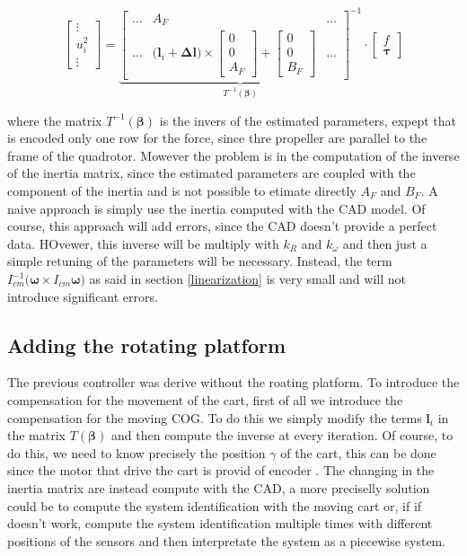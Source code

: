 \begin{equation}
	\begin{bmatrix}
		\vdots \\
		u_i^2 \\
		\vdots
	\end{bmatrix}
	=
	\underbrace{
	\begin{bmatrix}
		\dots   & A_F   & \dots  \\
		\dots & \Big(\mathbf{l}_i + \boldsymbol{\Delta l}\Big)\times\begin{bmatrix}0 \\ 0 \\ A_F \end{bmatrix}+\begin{bmatrix}0 \\ 0 \\ B_F\end{bmatrix} & \dots
	\end{bmatrix}^{-1}
	}_{T^{-1}(\boldsymbol{\beta})}	
	\cdot
	\begin{bmatrix}
		f \\
		\boldsymbol{\tau}
	\end{bmatrix}
	\label{eq:mixingMatrix}
\end{equation}

\noindent where the matrix $T^{-1}(\boldsymbol{\beta})$ is the invers of the estimated parameters, expept that is encoded only one row for the force, since thre propeller are parallel to the frame of the quadrotor. Mowever the problem is in the computation of the inverse of the inertia matrix, since the estimated parameters are coupled with the component of the inertia and is not possible to etimate directly $A_F$ and $B_F$. A naive approach is simply use the inertia computed with the CAD model. Of course, this approach will add errors, since the CAD doesn't provide a perfect data. HOvewer, this inverse will be multiply with $k_R$ and $k_{\omega}$ and then just a simple retuning of the parameters will be necessary. Instead, the term $I_{cm}^{-1}\bigl(\boldsymbol{\omega}\times I_{cm}\boldsymbol{\omega}\bigl)$ as said in section \ref{linearization} is very small and will not introduce significant errors.


\subsection{Adding the rotating platform}

The previous controller was derive without the roating platform. To introduce the compensation for the movement of the cart, first of all we introduce the compensation for the moving COG. To do this we simply modify the terms $\mathbf{l}_i$ in the matrix $T(\boldsymbol{\beta})$ and then compute the inverse at every iteration. Of course, to do this, we need to know precisely the position $\gamma$ of the cart, this can be done since the motor that drive the cart is provid of encoder \cite{Carlos}. The changing in the inertia matrix are instead compute with the CAD, a more preciselly solution could be to compute the system identification with the moving cart or, if if doesn't work, compute the system identification multiple times with different positions of the sensors and then interpretate the system as a piecewise system. 

